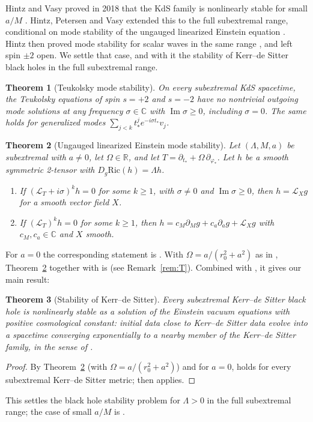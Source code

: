 \documentclass[11pt]{amsart}
\newtheorem{theorem}{Theorem}[section]
\theoremstyle{definition}
\theoremstyle{remark}
\numberwithin{equation}{section}
\newcommand{\cL}{\mathcal{L}}
\newcommand{\R}{\mathbb{R}}
\newcommand{\C}{\mathbb{C}}
\renewcommand{\Im}{\operatorname{Im}}
\begin{document}
Hintz and Vasy proved in 2018 that the KdS family is nonlinearly stable for small $a/M$ \cite{HV18}. Hintz, Petersen
and Vasy extended this to the full subextremal range, conditional on mode stability of the ungauged linearized
Einstein equation \cite[Assumption~1.2]{HPV25}. Hintz then proved mode stability for scalar waves in the same range
\cite{Hin26}, and left spin $\pm2$ open. We settle that case, and with it the stability of Kerr--de Sitter
black holes in the full subextremal range.

\begin{theorem}[Teukolsky mode stability]\label{thm:A}
On every subextremal KdS spacetime, the Teukolsky equations of spin $s=+2$ and $s=-2$ have no nontrivial outgoing
mode solutions at any frequency $\sigma\in\C$ with $\Im\sigma\ge0$, including $\sigma=0$. The same holds for
generalized modes $\sum_{j<k}t_*^je^{-i\sigma t_*}v_j$.
\end{theorem}

\begin{theorem}[Ungauged linearized Einstein mode stability]\label{thm:B}
Let $(\Lambda,M,a)$ be subextremal with $a\neq0$, let $\Omega\in\R$, and let $T=\partial_{t_*}+\Omega\,\partial_{\varphi_*}$.
Let $h$ be a smooth symmetric 2-tensor with $D_g\mathrm{Ric}(h)=\Lambda h$.
\begin{enumerate}[label=(\arabic*)]
\item If $(\cL_T+i\sigma)^kh=0$ for some $k\ge1$, with $\sigma\ne0$ and $\Im\sigma\ge0$, then $h=\cL_Xg$ for a smooth vector field $X$.
\item If $(\cL_T)^kh=0$ for some $k\ge1$, then $h=c_M\partial_Mg+c_a\partial_ag+\cL_Xg$ with $c_M,c_a\in\C$ and $X$
smooth.
\end{enumerate}
\end{theorem}

For $a=0$ the corresponding statement is \cite[\S7]{HV18}. With $\Omega=a/(r_0^2+a^2)$ as in \cite{HPV25},
Theorem~\ref{thm:B} together with \cite[\S7]{HV18} is \cite[Assumption~1.2]{HPV25} (see Remark~\ref{rem:T}). Combined with \cite[Theorem~1.4]{HPV25}, it gives our main result:

\begin{theorem}[Stability of Kerr--de Sitter]\label{thm:C}
Every subextremal Kerr--de Sitter black hole is nonlinearly stable as a solution of the Einstein vacuum equations with
positive cosmological constant: initial data close to Kerr--de Sitter data evolve into a spacetime converging
exponentially to a nearby member of the Kerr--de Sitter family, in the sense of \cite[Theorem~1.4]{HPV25}.
\end{theorem}
\begin{proof}
By Theorem~\ref{thm:B} (with $\Omega=a/(r_0^2+a^2)$) and \cite[\S7]{HV18} for $a=0$, \cite[Assumption~1.2]{HPV25} holds for every subextremal Kerr--de Sitter
metric; \cite[Theorem~1.4]{HPV25} then applies.
\end{proof}
This settles the black hole stability problem for $\Lambda>0$ in the full subextremal range; the case of small $a/M$
is \cite{HV18}.
\end{document}

